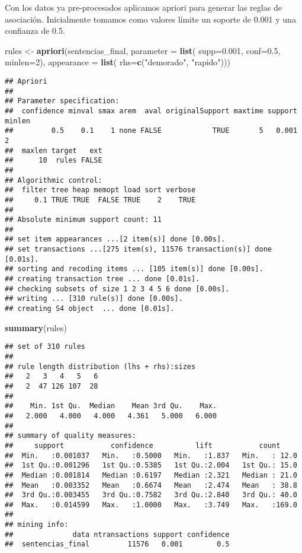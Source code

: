 \documentclass[runningheads,a4paper]{llncs}
\newenvironment{Shaded}{\footnotesize}{}
\newcommand{\KeywordTok}[1]{\textcolor[rgb]{0.00,0.44,0.13}{\textbf{{#1}}}}
\newcommand{\DataTypeTok}[1]{\textcolor[rgb]{0.56,0.13,0.00}{{#1}}}
\newcommand{\DecValTok}[1]{\textcolor[rgb]{0.25,0.63,0.44}{{#1}}}
\newcommand{\FloatTok}[1]{\textcolor[rgb]{0.25,0.63,0.44}{{#1}}}
\newcommand{\StringTok}[1]{\textcolor[rgb]{0.25,0.44,0.63}{{#1}}}
\newcommand{\NormalTok}[1]{{#1}}
\begin{document}
Con los datos ya pre-procesados aplicamos apriori para generar las
reglas de asociación. Inicialmente tomamos como valores límite un
soporte de 0.001 y una confianza de 0.5.

\scriptsize

\begin{Shaded}
\begin{Highlighting}[]
\NormalTok{rules <-}\StringTok{ }\KeywordTok{apriori}\NormalTok{(sentencias_final, }\DataTypeTok{parameter =} \KeywordTok{list}\NormalTok{(}
  \DataTypeTok{supp=}\FloatTok{0.001}\NormalTok{, }\DataTypeTok{conf=}\FloatTok{0.5}\NormalTok{, }\DataTypeTok{minlen=}\DecValTok{2}\NormalTok{), }\DataTypeTok{appearance =} \KeywordTok{list}\NormalTok{(}
    \DataTypeTok{rhs=}\KeywordTok{c}\NormalTok{(}\StringTok{"demorado"}\NormalTok{, }\StringTok{"rapido"}\NormalTok{)))}
\end{Highlighting}
\end{Shaded}

\begin{verbatim}
## Apriori
## 
## Parameter specification:
##  confidence minval smax arem  aval originalSupport maxtime support minlen
##         0.5    0.1    1 none FALSE            TRUE       5   0.001      2
##  maxlen target   ext
##      10  rules FALSE
## 
## Algorithmic control:
##  filter tree heap memopt load sort verbose
##     0.1 TRUE TRUE  FALSE TRUE    2    TRUE
## 
## Absolute minimum support count: 11 
## 
## set item appearances ...[2 item(s)] done [0.00s].
## set transactions ...[275 item(s), 11576 transaction(s)] done [0.01s].
## sorting and recoding items ... [105 item(s)] done [0.00s].
## creating transaction tree ... done [0.01s].
## checking subsets of size 1 2 3 4 5 6 done [0.00s].
## writing ... [310 rule(s)] done [0.00s].
## creating S4 object  ... done [0.01s].
\end{verbatim}

\begin{Shaded}
\begin{Highlighting}[]
\KeywordTok{summary}\NormalTok{(rules)}
\end{Highlighting}
\end{Shaded}

\begin{verbatim}
## set of 310 rules
## 
## rule length distribution (lhs + rhs):sizes
##   2   3   4   5   6 
##   2  47 126 107  28 
## 
##    Min. 1st Qu.  Median    Mean 3rd Qu.    Max. 
##   2.000   4.000   4.000   4.361   5.000   6.000 
## 
## summary of quality measures:
##     support           confidence          lift           count      
##  Min.   :0.001037   Min.   :0.5000   Min.   :1.837   Min.   : 12.0  
##  1st Qu.:0.001296   1st Qu.:0.5385   1st Qu.:2.004   1st Qu.: 15.0  
##  Median :0.001814   Median :0.6197   Median :2.321   Median : 21.0  
##  Mean   :0.003352   Mean   :0.6674   Mean   :2.474   Mean   : 38.8  
##  3rd Qu.:0.003455   3rd Qu.:0.7582   3rd Qu.:2.840   3rd Qu.: 40.0  
##  Max.   :0.014599   Max.   :1.0000   Max.   :3.749   Max.   :169.0  
## 
## mining info:
##              data ntransactions support confidence
##  sentencias_final         11576   0.001        0.5
\end{verbatim}
\end{document}
